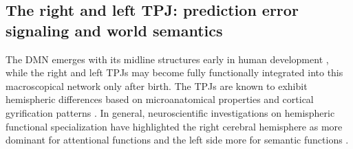 \documentclass[10pt,letterpaper]{article}
\begin{document}
\subsection{The right and left TPJ: prediction error signaling and world semantics}
The DMN emerges with its midline structures early in human development
\citep{doria2010}, while
the right and left TPJs may become fully functionally integrated into this macroscopical
network only after birth.
The TPJs are known to exhibit hemispheric differences
based on microanatomical properties and cortical gyrification patterns
\citep{seghier2013angular}.
In general, neuroscientific investigations on hemispheric functional specialization
have highlighted the right cerebral hemisphere as more dominant for attentional functions
and the left side more for semantic functions
\citep{seghier2013angular, bzdok2013tpj, bzdok2016left,
stephan2007mechanisms}.
\end{document}
